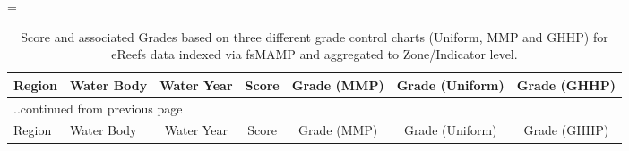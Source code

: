   
\sf
\LTcapwidth=\linewidth
\setlength\aboverulesep{0pt}\setlength\belowrulesep{0pt}
\setlength\cmidrulekern{1pt}\setlength\cmidrulewidth{1pt}
\renewcommand\arraystretch{1.2}\setlength\tabcolsep{5pt}
{
\small
\begin{longtable}{llccccc}
\caption{Score and associated Grades based on three different grade control charts (Uniform, MMP and GHHP) for eReefs data indexed via fsMAMP and aggregated to Zone/Indicator level.}\label{tab:GradeTypeComparisons}\\ 
\toprule
Region&Water Body & Water Year & Score & Grade (MMP) & Grade (Uniform) & Grade (GHHP)\\
\midrule
\endfirsthead
\multicolumn{7}{l}{..continued from previous page}\\
\toprule
Region&Water Body & Water Year & Score & Grade (MMP) & Grade (Uniform) & Grade (GHHP)\\
\midrule 


\end{longtable}}
